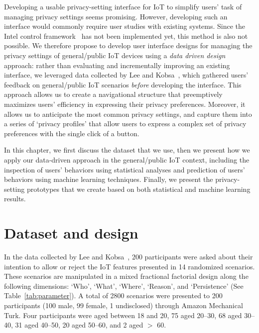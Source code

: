 Developing a usable privacy-setting interface for IoT to simplify users' task of managing privacy settings seems promising. However, developing such an interface would commonly require user studies with existing systems. Since the Intel control framework~\cite{chow2015hci} has not been implemented yet, this method is also not possible. We therefore propose to develop user interface designs for managing the privacy settings of general/public IoT devices using a \emph{data driven design} approach: rather than evaluating and incrementally improving an existing interface, we leveraged data collected by Lee and Kobsa~\cite{lee2016understanding}, which gathered users' feedback on general/public IoT scenarios \emph{before} developing the interface. This approach allows us to create a navigational structure that preemptively maximizes users' efficiency in expressing their privacy preferences. Moreover, it allows us to anticipate the most common privacy settings, and capture them into a series of `privacy profiles' that allow users to express a complex set of privacy preferences with the single click of a button.

In this chapter, we first discuss the dataset that we use, then we present how we apply our data-driven approach in the general/public IoT context, including the inspection of users' behaviors using statistical analyses and prediction of users' behaviors using machine learning techniques. Finally, we present the privacy-setting prototypes that we create based on both statistical and machine learning results.

\section{Dataset and design}
In the data collected by Lee and Kobsa~\cite{lee2016understanding}, 200 participants were asked about their intention to allow or reject the IoT features presented in 14 randomized scenarios. These scenarios are manipulated in a mixed fractional factorial design along the following dimensions: `Who', `What', `Where', `Reason', and `Persistence' (See Table~\ref{tab:parameter}). A total of 2800 scenarios were presented to 200 participants (100 male, 99 female, 1 undisclosed) through Amazon Mechanical Turk. Four participants were aged between 18 and 20, 75 aged 20--30, 68 aged 30--40, 31 aged 40--50, 20 aged 50--60, and 2 aged $>$ 60.

